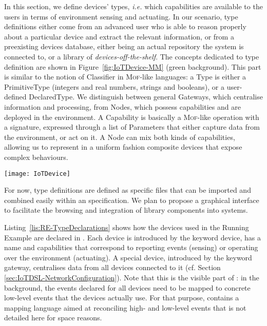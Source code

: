 In this section, we define \IOT devices' types, \textit{i.e.} which capabilities are available to the users in terms of environment sensing and actuating. In our scenario, type definitions either come from an advanced user who is able to reason properly about a particular device and extract the relevant information, or from a preexisting devices database, either being an actual repository the system is connected to, or a library of \textit{devices-off-the-shelf}. The concepts dedicated to type definition are shown in Figure~\ref{fig:IoTDevice-MM} (green background). This part is similar to the notion of \textsf{Classifier} in \textsc{Mof}-like languages: a \textsf{Type} is either a \textsf{PrimitiveType} (integers and real numbers, strings and booleans), or a user-defined \textsf{DeclaredType}. We distinguish between general \textsf{Gateway}s, which centralise information and processing, from \textsf{Node}s, which possess capabilities and are deployed in the environment. A \textsf{Capability} is basically a \textsc{Mof}-like operation with a signature, expressed through a list of \textsf{Parameter}s that either capture data from the environment, or act on it. A \textsf{Node} can mix both kinds of capabilities, allowing us to represent in a uniform fashion composite devices that expose complex behaviours.

\begin{figure*}[h!]%
\texttt{[image: IoTDevice]}%
\caption{Metamodel of \IOTDSL, separated in three concerns: \emph{Type Definition} captures devices' capabilities (top green part), \emph{Network Configuration} details how device instances are connected to each others (middle purple part), \emph{Business Rules} defines the functionalities expected from the IoT installation (bottom yellow part).}%
\label{fig:IoTDevice-MM}%
\end{figure*}

For now, type definitions are defined as specific files that can be imported and combined easily within an \IOT specification. We plan to propose a graphical interface to facilitate the browsing and integration of library components into \IOT systems.

Listing~\ref{lis:RE-TypeDeclarations} shows how the devices used in the Running Example are declared in \IOTDSL. Each device is introduced by the keyword \textsf{device}, has a name and capabilities that correspond to reporting events (\textsf{sensing}) or operating over the environment (\textsf{actuating}). A special device, introduced by the keyword \textsf{gateway}, centralises data from all devices connected to it (cf. Section \ref{sec:IoTDSL-NetworkConfiguration}). Note that this is the visible part of \IOTDSL: in the background, the events declared for all devices need to be mapped to concrete low-level events that the devices actually use. For that purpose, \IOTDSL contains a mapping language aimed at reconciling high- and low-level events that is not detailed here for space reasons.

